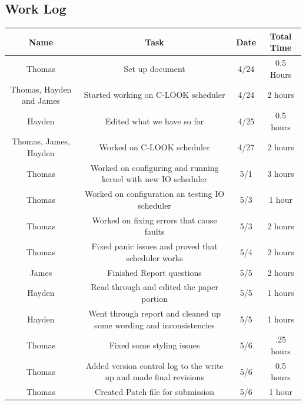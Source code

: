 \documentclass[draftclsnofoot, onecolumn, compsoc, 10pt]{IEEEtran}
\begin{document}
\begin{landscape}

\section{Work Log}
    	\begin{center}
			\begin{tabular}{||c c c c ||}
			\hline
			Name & Task & Date & Total Time\\[0.5ex]
			\hline \hline
			Thomas & Set up document  & 4/24 & 0.5 Hours\\
			\hline
			Thomas, Hayden and James & Started working on C-LOOK scheduler & 4/24 & 2 hours\\
            \hline
            Hayden & Edited what we have so far & 4/25 & 0.5 hours\\
            \hline
            Thomas, James, Hayden & Worked on C-LOOK scheduler & 4/27 & 2 hours\\
            \hline
            Thomas & Worked on configuring and running kernel with new IO scheduler & 5/1 & 3 hours\\
            \hline
            Thomas & Worked on configuration an testing IO scheduler & 5/3 & 1 hour \\
            \hline
            Thomas & Worked on fixing errors that cause faults & 5/3 & 2 hours\\
            \hline
            Thomas & Fixed panic issues and proved that scheduler works & 5/4 & 2 hours\\
            \hline
            James & Finished Report questions & 5/5 & 2 hours\\
            \hline
            Hayden & Read through and edited the paper portion & 5/5 & 1 hours\\
            \hline
            Hayden & Went through report and cleaned up some wording and inconsistencies & 5/5 & 1 hours\\
            \hline
            Thomas & Fixed some styling issues & 5/6 & .25 hours\\
            \hline
            Thomas & Added version control log to the write up and made final revisions & 5/6 & 0.5 hours\\
            \hline
            Thomas & Created Patch file for submission & 5/6 & 1 hour\\
            \hline
			\end{tabular}
		\end{center}
\end{landscape}
\newpage
\end{document}
